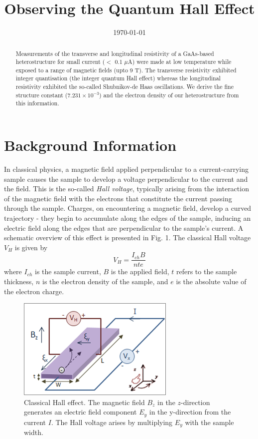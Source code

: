\documentclass[aps,prl,nofootinbib,twocolumn,superscriptaddress,groupedaddress]{revtex4}  %
\begin{document}
\title{Observing the Quantum Hall Effect}
\date{\today}

\begin{abstract}
Measurements of the transverse and longitudinal resistivity of a GaAs-based heterostructure for small current ($<$ 0.1 $\mu$A) were made at low temperature while exposed to a range of magnetic fields (upto 9 T). The transverse resistivity exhibited integer quantisation (the integer quantum Hall effect) whereas the longitudinal resistivity exhibited the so-called Shubnikov-de Haas oscillations. We derive the fine structure constant ($7.231 \times 10^{-3}$) and the electron density of our heterostructure from this information.
\end{abstract}

\maketitle

\section{Background Information}
In classical physics, a magnetic field applied perpendicular to a current-carrying sample causes the sample to develop a voltage perpendicular to the current and the field. This is the so-called \textsl{Hall voltage}, typically arising from the interaction of the magnetic field with the electrons that constitute the current passing through the sample. Charges, on encountering a magnetic field, develop a curved trajectory - they begin to accumulate along the edges of the sample, inducing an electric field along the edges that are perpendicular to the sample's current. A schematic overview of this effect is presented in Fig. 1. The classical Hall voltage $V_{H}$ is given by\cite{nobel} \begin{equation}
V_{H} = \frac{I_{ch}B}{nte}
\end{equation}
where $I_{ch}$ is the sample current, $B$ is the applied field, $t$ refers to the sample thickness, $n$ is the electron density of the sample, and $e$ is the absolute value of the electron charge. 

\begin{figure}[b]
\centering
\includegraphics[scale = 0.9]{Hall.PNG}
\caption{Classical Hall effect. The magnetic field $B_{z}$ in the $z$-direction generates an electric field component $E_{y}$ in the y-direction from the current $I$. The Hall voltage arises by multiplying $E_{y}$ with the sample width.}
\end{figure}
\end{document}
